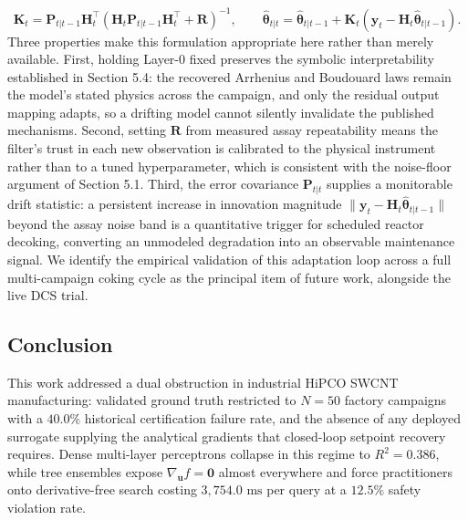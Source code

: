 \documentclass[10pt,journal,onecolumn]{IEEEtran}
\begin{document}
\begin{equation}
\mathbf{K}_t = \mathbf{P}_{t|t-1}\mathbf{H}_t^\top\!\left(\mathbf{H}_t\mathbf{P}_{t|t-1}\mathbf{H}_t^\top + \mathbf{R}\right)^{-1}, \qquad \hat{\boldsymbol{\theta}}_{t|t} = \hat{\boldsymbol{\theta}}_{t|t-1} + \mathbf{K}_t\!\left(\mathbf{y}_t - \mathbf{H}_t\hat{\boldsymbol{\theta}}_{t|t-1}\right).
\end{equation}
Three properties make this formulation appropriate here rather than merely available. First, holding Layer-0 fixed preserves the symbolic interpretability established in Section 5.4: the recovered Arrhenius and Boudouard laws remain the model's stated physics across the campaign, and only the residual output mapping adapts, so a drifting model cannot silently invalidate the published mechanisms. Second, setting $\mathbf{R}$ from measured assay repeatability means the filter's trust in each new observation is calibrated to the physical instrument rather than to a tuned hyperparameter, which is consistent with the noise-floor argument of Section 5.1. Third, the error covariance $\mathbf{P}_{t|t}$ supplies a monitorable drift statistic: a persistent increase in innovation magnitude $\|\mathbf{y}_t - \mathbf{H}_t\hat{\boldsymbol{\theta}}_{t|t-1}\|$ beyond the assay noise band is a quantitative trigger for scheduled reactor decoking, converting an unmodeled degradation into an observable maintenance signal. We identify the empirical validation of this adaptation loop across a full multi-campaign coking cycle as the principal item of future work, alongside the live DCS trial.

\subsection{Conclusion}
This work addressed a dual obstruction in industrial HiPCO SWCNT manufacturing: validated ground truth restricted to $N = 50$ factory campaigns with a $40.0\%$ historical certification failure rate, and the absence of any deployed surrogate supplying the analytical gradients that closed-loop setpoint recovery requires. Dense multi-layer perceptrons collapse in this regime to $R^2 = 0.386$, while tree ensembles expose $\nabla_{\mathbf{u}} f = \mathbf{0}$ almost everywhere and force practitioners onto derivative-free search costing $3,754.0\text{ ms}$ per query at a $12.5\%$ safety violation rate.
\end{document}
